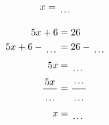\documentclass[12pt]{article}
\newcounter{minipagecount}
\begin{document}
\begin{multicols}{2}
\begin{minipage}[t]{0.45\textwidth}
\begin{align*}
        x &= \dotuline{\hspace{5mm}}\\
    \end{align*}
\end{minipage} %
\noindent{(\theminipagecount)}\hspace{0.1mm} %
\begin{minipage}[t]{0.45\textwidth} %
    \vspace{-26pt}  %
    \raggedright %
    \begin{align*} %
        5x + 6 &= 26\\
        5x + 6 - \dotuline{\hspace{5mm}} &= 26 - \dotuline{\hspace{5mm}}\\
        5x &= \dotuline{\hspace{5mm}}\\
        \frac{5x}{\dotuline{\hspace{5mm}}} &= \frac{\dotuline{\hspace{5mm}}}{\dotuline{\hspace{5mm}}}\\
        x &= \dotuline{\hspace{5mm}}\\
    \end{align*}
\end{minipage} %
\noindent{(\theminipagecount)}\hspace{0.1mm} %
\begin{minipage}[t]{0.45\textwidth} %
    \vspace{-26pt}  %

\end{minipage}
\end{multicols}
\end{document}
